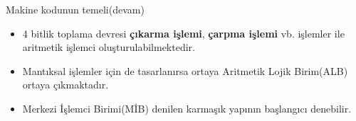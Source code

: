 \begin{frame}[fragile]{Makine kodunun temeli(devam)}
    \begin{itemize}
    \item 4 bitlik toplama devresi \textbf{çıkarma işlemi}, \textbf{çarpma işlemi} vb. işlemler ile aritmetik işlemci oluşturulabilmektedir. 
    \item Mantıksal işlemler için de tasarlanırsa ortaya Aritmetik Lojik Birim(ALB) ortaya çıkmaktadır. 
    \item Merkezi İşlemci Birimi(MİB) denilen karmaşık yapının başlangıcı denebilir.
    \end{itemize}
\end{frame}
